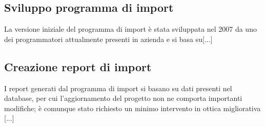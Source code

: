 \subsection{Sviluppo programma di import}
La versione iniziale del programma di import è stata sviluppata nel 2007 da uno dei programmatori attualmente presenti in azienda e si basa su[...] \\


\subsection{Creazione report di import}
I report generati dal programma di import si basano su dati presenti nel database, per cui l'aggiornamento del progetto non ne comporta importanti modifiche; è comunque stato richiesto un minimo intervento in ottica migliorativa [...]\\